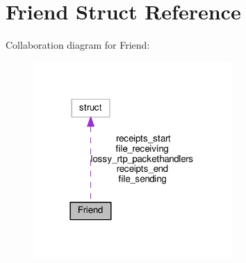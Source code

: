 \hypertarget{struct_friend}{\section{Friend Struct Reference}
\label{struct_friend}
}


Collaboration diagram for Friend\+:
\nopagebreak
\begin{figure}[H]
\begin{center}
\leavevmode
\includegraphics[width=214pt]{struct_friend__coll__graph}
\end{center}
\end{figure}
